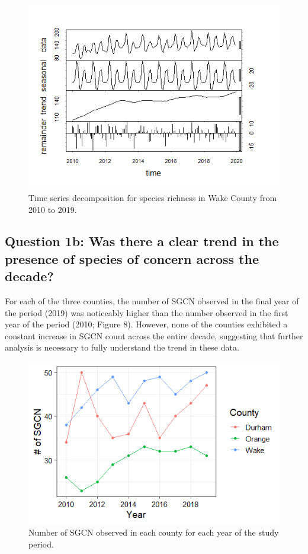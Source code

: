 \documentclass[
  12pt,
]{article}
\begin{document}
\begin{figure}
\centering
\includegraphics{./Output/Wake_spp_ts_decomp.png}
\caption{Time series decomposition for species richness in Wake County
from 2010 to 2019.}
\end{figure}

\clearpage

\hypertarget{question-1b-was-there-a-clear-trend-in-the-presence-of-species-of-concern-across-the-decade}{%
\subsection{Question 1b: Was there a clear trend in the presence of
species of concern across the
decade?}\label{question-1b-was-there-a-clear-trend-in-the-presence-of-species-of-concern-across-the-decade}}

For each of the three counties, the number of SGCN observed in the final
year of the period (2019) was noticeably higher than the number observed
in the first year of the period (2010; Figure 8). However, none of the
counties exhibited a constant increase in SGCN count across the entire
decade, suggesting that further analysis is necessary to fully
understand the trend in these data.

\begin{figure}
\centering
\includegraphics{./Output/SGCN_plot.png}
\caption{Number of SGCN observed in each county for each year of the
study period.}
\end{figure}
\end{document}
